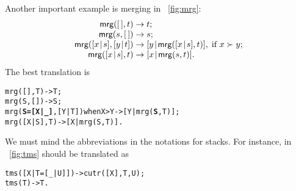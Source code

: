 \noindent Another important example is merging in \fig~\vref{fig:mrg}:
\begin{equation*}
\begin{array}{@{}r@{\;}l@{\;}l@{}}
\fun{mrg}(\el,t)         & \rightarrow & t;\\
\fun{mrg}(s,\el)         & \rightarrow & s;\\
\fun{mrg}(\cons{x}{s},\cons{y}{t}) & \rightarrow
& \cons{y}{\fun{mrg}(\cons{x}{s},t)},\;\text{if \(x \succ y\)};\\
\fun{mrg}(\cons{x}{s},t) & \rightarrow
                         & \cons{x}{\fun{mrg}(s,t)}.
\end{array}
\end{equation*}
The best translation is
\begin{alltt}
mrg(     [],    T)            -> T;
mrg(     S,    [])            -> S;
mrg(\textbf{S=[X|\_]},[Y|T]) when X > Y -> [Y|mrg(\textbf{S},T)];
mrg(  [X|S],    T)            -> [X|mrg(S,T)].
\end{alltt}
We must mind the abbreviations in the notations for stacks. For
instance,  in \fig~\vref{fig:tms} should be translated as
\begin{alltt}
tms([X|T=[\_|U]]) -> cutr([X],T,U);
tms(          T) -> T.
\end{alltt}

